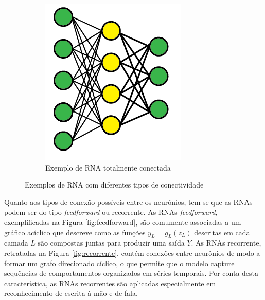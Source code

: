 \begin{figure}
\begin{subfigure}[h]{0.3\linewidth}
		\includegraphics[width=\linewidth]{img/totalmenteconectada}
		\caption{Exemplo de RNA totalmente conectada}
		\label{fig:total_conectada}
	\end{subfigure}%
	\caption{Exemplos de RNA com diferentes tipos de conectividade}
	\label{fig:rna_conectividade}
\end{figure}

Quanto aos tipos de conexão possíveis entre os neurônios, tem-se que as RNAs podem ser do tipo \emph{feedforward} ou recorrente. As RNAs \emph{feedforward}, exemplificadas na Figura \ref{fig:feedforward}, são comumente associadas a um gráfico acíclico que descreve como as funções $y_L=g_L(z_L)$ descritas em cada camada $L$ são compostas juntas para produzir uma saída $Y$. As RNAs recorrente, retratadas na Figura \ref{fig:recorrente}, contém conexões entre neurônios de modo a formar um grafo direcionado cíclico, o que permite que o modelo capture sequências de comportamentos organizados em séries temporais. Por conta desta característica, as RNAs recorrentes são aplicadas especialmente em reconhecimento de escrita à mão e de fala.

